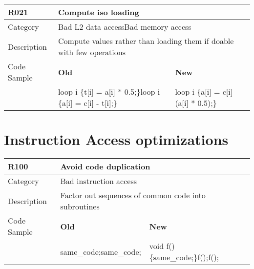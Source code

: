 \begin{tabular}{|p{0.9in}|p{2.0in}|p{2.0in}|} \hline
\textbf{R021}       & \multicolumn{2}{|p{4.0in}|}{\textbf{Compute iso loading}} \\ \hline
Category            & \multicolumn{2}{|p{4.0in}|}{Bad L2 data access\newline Bad memory access} \\ \hline
Description         & \multicolumn{2}{|p{4.0in}|}{Compute values rather than loading them if doable with few operations} \\ \hline
Code Sample         & \textbf{Old} & \textbf{New} \\ \hline
                    & loop i \{\newline   t[i] = a[i] * 0.5;\newline \}\newline loop i \{\newline   a[i] = c[i] - t[i];\newline \}
                    & loop i \{\newline   a[i] = c[i] - (a[i] * 0.5);\newline \} \\ \hline
\end{tabular}

\section{Instruction Access optimizations}
\label{sec:Instruction_Access_Optimizations}

\begin{tabular}{|p{0.9in}|p{2.0in}|p{2.0in}|} \hline
\textbf{R100}       & \multicolumn{2}{|p{4.0in}|}{\textbf{Avoid code duplication}} \\ \hline
Category            & \multicolumn{2}{|p{4.0in}|}{Bad instruction access} \\ \hline
Description         & \multicolumn{2}{|p{4.0in}|}{Factor out sequences of common code into subroutines} \\ \hline
Code Sample         & \textbf{Old} & \textbf{New} \\ \hline
                    & same\_code;\newline same\_code;
                    & void f() \{same\_code;\}\newline f();\newline f(); \\ \hline
\end{tabular}

